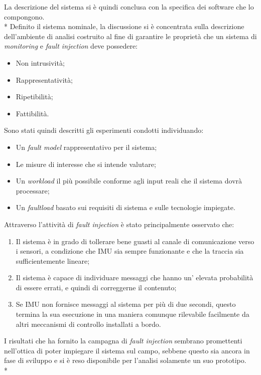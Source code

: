 La descrizione del sistema si \`e quindi conclusa con la specifica dei software che lo compongono.\\*
Definito il sistema nominale, la discussione si \`e concentrata sulla descrizione dell'ambiente di analisi costruito al fine di garantire le propriet\`a che un sistema di \emph{monitoring} e \emph{fault injection} deve possedere:
\begin{itemize}
	\item Non intrusivit\`a;
	\item Rappresentativit\`a;
	\item Ripetibilit\`a;
	\item Fattibilit\`a.
\end{itemize}
Sono stati quindi descritti gli esperimenti condotti individuando:
\begin{itemize}
	\item Un \emph{fault model} rappresentativo per il sistema;
	\item Le misure di interesse che si intende valutare;
	\item Un \emph{workload} il pi\`u possibile conforme agli input reali che il sistema dovr\`a processare;
	\item Un \emph{faultload} basato sui requisiti di sistema e sulle tecnologie impiegate.
\end{itemize}
Attraverso l'attivit\`a di \emph{fault injection} \`e stato principalmente osservato che:
\begin{enumerate}
	\item  Il sistema \`e in grado di tollerare bene guasti al canale di comunicazione verso i sensori, a condizione che IMU sia sempre funzionante e che la traccia sia sufficientemente lineare;
	\item Il sistema \`e capace di individuare messaggi che hanno un' elevata probabilit\`a di essere errati, e quindi di correggerne il contenuto;
	\item Se IMU non fornisce messaggi al sistema per pi\`u di due secondi, questo termina la sua esecuzione in una maniera comunque rilevabile facilmente da altri meccanismi di controllo installati a bordo.
\end{enumerate}
I risultati che ha fornito la campagna di \emph{fault injection} sembrano promettenti nell'ottica di poter impiegare il sistema sul campo, sebbene questo sia ancora in fase di sviluppo e si \`e reso disponibile per l'analisi solamente un suo prototipo.\\*